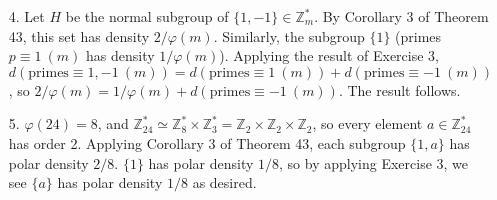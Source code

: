 \documentclass{article}
\newcommand{\Z}[0]{\mathbb{Z}}
\newcommand{\Zmult}[1]{\mathbb{Z}_{#1}^{*}}
\newcommand{\modequiv}[3]{#1 \equiv #2\ (#3)}
\begin{document}
\begin{enumerate}
    \item [4.] Let $H$ be the normal subgroup of $\{1, -1\} \in \Z^{*}_m$. By Corollary 3 of Theorem 43, this set has density $2 / \varphi(m)$.  Similarly, the subgroup $\{1\}$ (primes $\modequiv{p}{1}{m}$ has density $1 / \varphi(m)$).  Applying the result of Exercise 3, $d(\modequiv{\text{primes}}{1, -1}{m}) = d(\modequiv{\text{primes}}{1}{m}) + d(\modequiv{\text{primes}}{-1}{m})$, so $2 / \varphi(m) = 1 / \varphi(m) + d(\modequiv{\text{primes}}{-1}{m})$.  The result follows.

    \item [5.] $\varphi(24) = 8$, and $\Zmult{24} \simeq \Zmult{8} \times \Zmult{3} = \Z_{2} \times \Z_{2} \times \Z_{2}$, so every element $a \in \Zmult{24}$ has order 2.  Applying Corollary 3 of Theorem 43, each subgroup $\{1, a\}$ has polar density $2 / 8$.  $\{1\}$ has polar density $1 / 8$, so by applying Exercise 3, we see $\{a\}$ has polar density $1 / 8$ as desired.
\end{enumerate}
\end{document}
